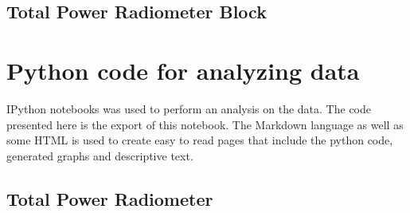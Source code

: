 \newcommand{\code}[2]{
  \hrulefill
  \subsection*{#1}
  
  \vspace{2em}
}

\code{Total Power Radiometer Block}{Code/TPR.py}
\newpage


%  


\section*{Python code for analyzing data}
IPython notebooks was used to perform an analysis on the data.  The code presented here is the export of this notebook.  The Markdown language as well as some HTML is used to create easy to read pages that include the python code, generated graphs and descriptive text.  

\newcommand{\pythoncode}[2]{
  \hrulefill
  \subsection*{#1}
  
  \vspace{2em}
}

\pythoncode{Total Power Radiometer}{Code/iPython/Radiometer_Parse.py}

